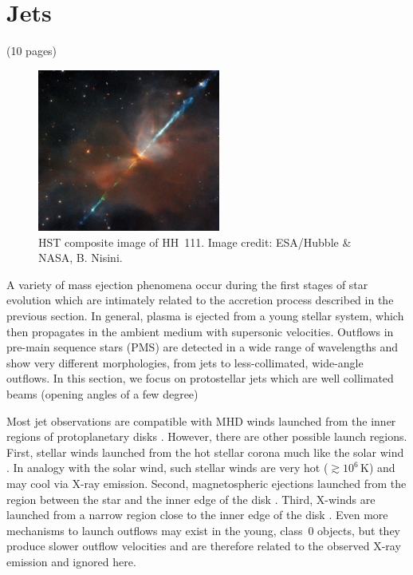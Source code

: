 
\section{Jets}
 {\color{blue}        (10 pages)}


\begin{figure}[t]
 \centering
\includegraphics[width=6cm]{figs/HH111_-_HST_-_Potw2135a.jpg}
\caption{HST composite image of HH~111. Image credit: ESA/Hubble \& NASA, B. Nisini. \label{fig:HH111} }
\end{figure}



A variety of mass ejection phenomena occur during the first stages of star evolution which are intimately related to the accretion process described in the previous section. In general, plasma is ejected from a young stellar system, which then propagates in the ambient medium with supersonic velocities. Outflows in pre-main sequence stars (PMS) are detected in a wide range of wavelengths and show very different morphologies, from jets to less-collimated, wide-angle outflows. In this section, we focus on protostellar jets which are well collimated beams (opening angles of a few degree)

Most jet observations are compatible with MHD winds launched from the inner regions of protoplanetary disks \citep{Frank_2014}. However, there are other possible launch regions. First, stellar winds launched from the hot stellar corona much like the solar wind \citep{Matt_2005}. In analogy with the solar wind, such stellar winds are very hot ($\gtrsim10^6$\,K) and may cool via X-ray emission. Second, magnetospheric ejections launched from the region between the star and the inner edge of the disk \citep{Zanni_2013}. Third, X-winds are launched from a narrow region close to the inner edge of the disk \citep{Shu_1994}. Even more mechanisms to launch outflows may exist  in the young, class~0 objects, but they produce slower outflow velocities and are therefore related to the observed X-ray emission and ignored here.

